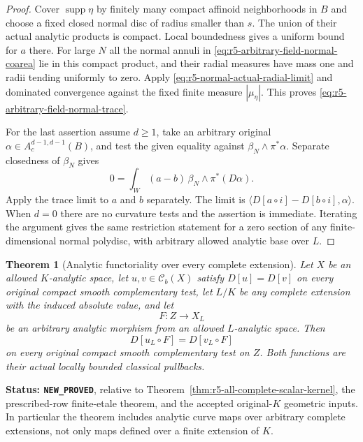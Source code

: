 \documentclass[11pt,a4paper]{article}
\numberwithin{equation}{section}
\newtheorem{theorem}{Theorem}[section]
\theoremstyle{definition}
\theoremstyle{remark}
\begin{document}
\begin{proof}
Cover $\operatorname{supp}\eta$ by finitely many compact affinoid
neighborhoods in $B$ and choose a fixed closed normal disc of radius
smaller than $s$.  The union of their actual analytic products is
compact.  Local boundedness gives a
uniform bound for $a$ there.  For large $N$ all the normal annuli in
\eqref{eq:r5-arbitrary-field-normal-coarea} lie in this compact
product, and their radial measures have mass one and radii tending
uniformly to zero.  Apply \eqref{eq:r5-normal-actual-radial-limit}
and dominated convergence against the fixed finite measure
$|\mu_\eta|$.  This proves
\eqref{eq:r5-arbitrary-field-normal-trace}.

For the last assertion assume $d\geq1$, take an arbitrary original
$\alpha\in A_c^{d-1,d-1}(B)$, and test the given equality against
$\beta_N\wedge\pi^*\alpha$.  Separate closedness of $\beta_N$
gives
\[
 0=\int_W(a-b)\,\beta_N\wedge\pi^*(D\alpha).
\]
Apply the trace limit to $a$ and $b$ separately.  The limit is
$\langle D[a\circ i]-D[b\circ i],\alpha\rangle$.
When $d=0$ there are no curvature tests and the assertion is
immediate.  Iterating the argument gives the same restriction
statement for a zero section of any finite-dimensional normal
polydisc, with arbitrary allowed analytic base over $L$.
\end{proof}

\begin{theorem}[Analytic functoriality over every complete extension]
\label{thm:r5-all-extension-analytic-kernel}
Let $X$ be an allowed $K$-analytic space, let
$u,v\in\mathcal C_b(X)$ satisfy $D[u]=D[v]$ on every original
compact smooth complementary test, let $L/K$ be any complete
extension with the induced absolute value, and let
\[
                       F:Z\longrightarrow X_L
\]
be an arbitrary analytic morphism from an allowed $L$-analytic
space.  Then
\begin{equation}
               D[u_L\circ F]=D[v_L\circ F]
 \label{eq:r5-all-extension-analytic-kernel}
\end{equation}
on every original compact smooth complementary test on $Z$.
Both functions are their actual locally bounded classical
pullbacks.
\end{theorem}

\noindent\textbf{Status: \texttt{NEW\_PROVED}}, relative to
Theorem~\ref{thm:r5-all-complete-scalar-kernel}, the prescribed-row
finite-etale theorem, and the accepted original-$K$ geometric
inputs.  In particular the theorem includes analytic curve maps
over arbitrary complete extensions, not only maps defined over a
finite extension of $K$.
\end{document}
